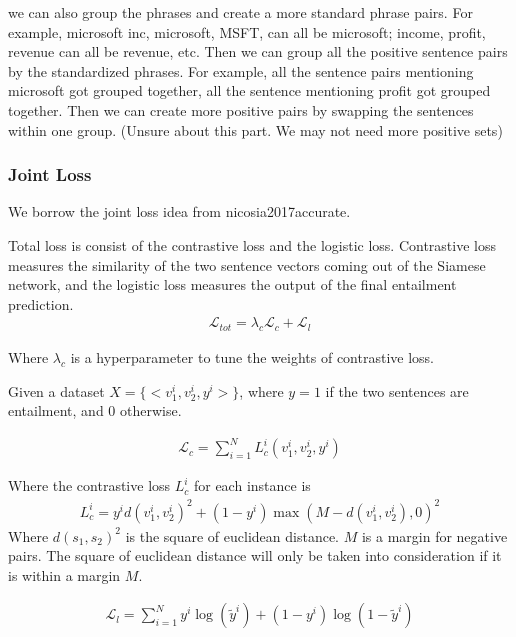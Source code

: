 \documentclass[letterpaper]{article}
\begin{document}
we can also group the phrases and create a more standard phrase pairs. For example, microsoft inc, microsoft, MSFT, can all be microsoft; income, profit, revenue can all be revenue, etc. Then we can group all the positive sentence pairs by the standardized phrases. For example, all the sentence pairs mentioning microsoft got grouped together, all the sentence mentioning profit got grouped together. Then we can create more positive pairs by swapping the sentences within one group. (Unsure about this part. We may not need more positive sets)

\subsubsection{Joint Loss}

We borrow the joint loss idea from {nicosia2017accurate}.

Total loss is consist of the contrastive loss and the logistic loss. Contrastive loss measures the similarity of the two sentence vectors coming out of the Siamese network, and the logistic loss measures the output of the final entailment prediction.
\begin{align}
\mathcal{L}_{tot} = \lambda_c\mathcal{L}_c + \mathcal{L}_l
\end{align}

Where $\lambda_c$ is a hyperparameter to tune the weights of contrastive loss.

Given a dataset $X = \{<v_1^i, v_2^i, y^i>\}$, where $y=1$ if the two sentences are entailment, and $0$ otherwise.

\begin{align}
\mathcal{L}_c = \sum_{i=1}^N L_c^i(v_1^i, v_2^i, y^i)
\end{align}

Where the contrastive loss $L_c^i$ for each instance is
\begin{align}
L_c^i = y^id(v_1^i, v_2^i)^2 + (1-y^i)\max(M-d(v_1^i, v_2^i), 0)^2
\end{align}
Where $d(s_1, s_2)^2$ is the square of euclidean distance. $M$ is a margin for negative pairs. The square of euclidean distance will only be taken into consideration if it is within a margin $M$.

\begin{align}
\mathcal{L}_l = \sum_{i=1}^N y^i \log(\tilde{y}^i) + (1-y^i)\log(1-\tilde{y}^i)
\end{align}
\end{document}
